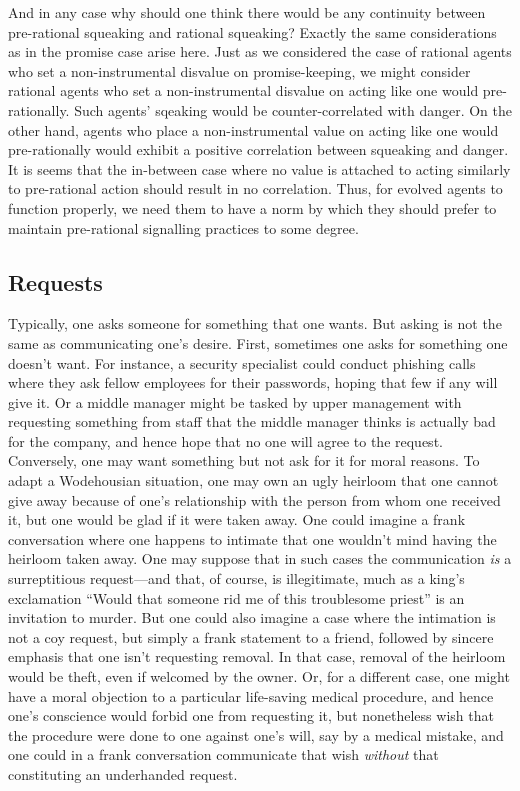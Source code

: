 And in any case why should one think there would be any continuity between pre-rational squeaking and rational squeaking?
Exactly the same considerations as in the promise case arise here. Just as we considered the case of rational
agents who set a non-instrumental disvalue on promise-keeping, we might consider rational agents who set a
non-instrumental disvalue on acting like one would pre-rationally. Such agents' sqeaking would be counter-correlated
with danger. On the other hand, agents who place a non-instrumental value on acting like one would pre-rationally would
exhibit a positive correlation between squeaking and danger. It is seems that the in-between case where
no value is attached to acting similarly to pre-rational action should result in no correlation. Thus, for evolved
agents to function properly, we need them to have a norm by which they should prefer to maintain pre-rational 
signalling practices to some degree. 

\subsection{Requests}
Typically, one asks someone for something that one wants. But asking is not the same as communicating one's desire. First,
sometimes one asks for something one doesn't want. For instance, a security specialist could conduct phishing calls where they
ask fellow employees for their passwords, hoping that few if any will give it. Or a middle manager might be tasked by upper
management with requesting something from staff that the middle manager thinks is actually bad for the company, and hence hope
that no one will agree to the request. Conversely, one may want something but not ask for it for moral reasons. To adapt a 
Wodehousian situation, one may own an ugly heirloom that one cannot give away because 
of one's relationship with the person from whom one received it, but one would be glad if it were taken away. One could imagine
a frank conversation where one happens to intimate that one wouldn't mind having the heirloom taken away. One may suppose that
in such cases the communication \textit{is} a surreptitious request---and that, of course, is illegitimate, much as a king's
exclamation ``Would that someone rid me of this troublesome priest'' is an invitation to murder. But one could also imagine
a case where the intimation is not a coy request, but simply a frank statement to a friend, followed by sincere emphasis that one isn't
requesting removal. In that case, removal of the heirloom would be theft, even if welcomed by the owner. Or, for a
different case, one might have a moral objection to a particular life-saving medical procedure, and hence one's conscience would
forbid one from requesting it, but nonetheless wish that the procedure were done to one against one's will, say by a medical
mistake, and one could in a frank conversation communicate that wish \textit{without} that constituting an underhanded request.

